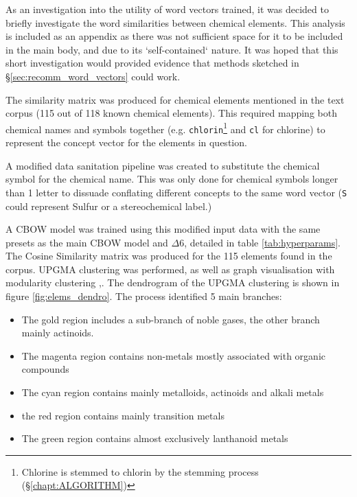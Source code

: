 \label{sec:Elemental_Analysis}
As an investigation into the utility of word vectors trained, it was decided to briefly investigate the word similarities between chemical elements. This analysis is included as an appendix as there was not sufficient space for it to be included in the main body, and due to its `self-contained` nature. It was hoped that this short investigation would provided evidence that methods sketched in \S\ref{sec:recomm_word_vectors} could work.

The similarity matrix was produced for chemical elements mentioned in the text corpus (115 out of 118 known chemical elements). This required mapping both chemical names and symbols together (e.g. \texttt{chlorin}\footnote{Chlorine is stemmed to chlorin by the stemming process (\S\ref{chapt:ALGORITHM}) }  and \texttt{cl} for chlorine) to represent the concept vector for the elements in question.

A modified data sanitation pipeline was created to substitute the chemical symbol for the chemical name. This was only done for chemical symbols longer than 1 letter to dissuade conflating different concepts to the same word vector (\texttt{S} could represent Sulfur or a stereochemical label.)
 
A CBOW model was trained using this modified input data with the same presets as the main CBOW model and $\Delta6$, detailed in table \ref{tab:hyperparams}. The Cosine Similarity matrix was produced for the 115 elements found in the corpus. UPGMA clustering was performed\cite{scikitlearn}, as well as graph visualisation with modularity clustering \cite{modularity1},\cite{modularity2}. The dendrogram of the UPGMA clustering is shown in figure \ref{fig:elems_dendro}. The process identified 5 main branches:
\begin{itemize}
\itemsep-0.5em
\item The gold region includes a sub-branch of noble gases, the other branch mainly actinoids.
\item The magenta region contains non-metals mostly associated with organic compounds
\item The cyan region contains mainly metalloids, actinoids and alkali metals
\item the red region contains mainly transition metals
\item The green region contains almost exclusively lanthanoid metals 
\end{itemize}


